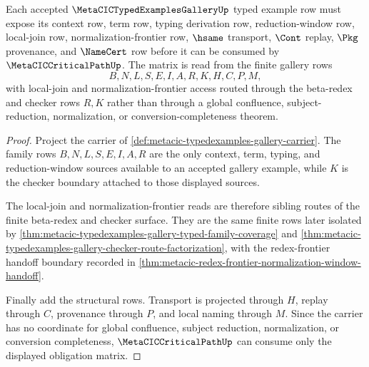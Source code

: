 \begin{theorem}
\label{thm:metacictypedexamplesgallery-obligation-matrix}
Each accepted $\MetaCICTypedExamplesGalleryUp$ typed example row must expose its context row, term row, typing derivation row, reduction-window row, local-join row, normalization-frontier row, $\hsame$ transport, $\Cont$ replay, $\Pkg$ provenance, and $\NameCert$ row before it can be consumed by $\MetaCICCriticalPathUp$. The matrix is read from the finite gallery rows
$$
B,N,L,S,E,I,A,R,K,H,C,P,M,
$$
with local-join and normalization-frontier access routed through the beta-redex and checker rows $R,K$ rather than through a global confluence, subject-reduction, normalization, or conversion-completeness theorem.
\end{theorem}
\begin{proof}
Project the carrier of \autoref{def:metacic-typedexamples-gallery-carrier}. The family rows $B,N,L,S,E,I,A,R$ are the only context, term, typing, and reduction-window sources available to an accepted gallery example, while $K$ is the checker boundary attached to those displayed sources.

The local-join and normalization-frontier reads are therefore sibling routes of the finite beta-redex and checker surface. They are the same finite rows later isolated by \autoref{thm:metacic-typedexamples-gallery-typed-family-coverage} and \autoref{thm:metacic-typedexamples-gallery-checker-route-factorization}, with the redex-frontier handoff boundary recorded in \autoref{thm:metacic-redex-frontier-normalization-window-handoff}.

Finally add the structural rows. Transport is projected through $H$, replay through $C$, provenance through $P$, and local naming through $M$. Since the carrier has no coordinate for global confluence, subject reduction, normalization, or conversion completeness, $\MetaCICCriticalPathUp$ can consume only the displayed obligation matrix.
\end{proof}

